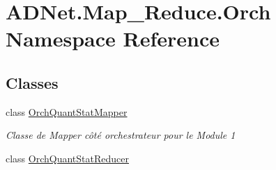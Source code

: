 \hypertarget{namespace_a_d_net_1_1_map___reduce_1_1_orch}{}\section{A\+D\+Net.\+Map\+\_\+\+Reduce.\+Orch Namespace Reference}
\label{namespace_a_d_net_1_1_map___reduce_1_1_orch}
\subsection*{Classes}
\begin{DoxyCompactItemize}
\item 
class \hyperlink{class_a_d_net_1_1_map___reduce_1_1_orch_1_1_orch_quant_stat_mapper}{Orch\+Quant\+Stat\+Mapper}
\begin{DoxyCompactList}\small\item\em Classe de Mapper côté orchestrateur pour le Module 1 \end{DoxyCompactList}\item 
class \hyperlink{class_a_d_net_1_1_map___reduce_1_1_orch_1_1_orch_quant_stat_reducer}{Orch\+Quant\+Stat\+Reducer}
\end{DoxyCompactItemize}
